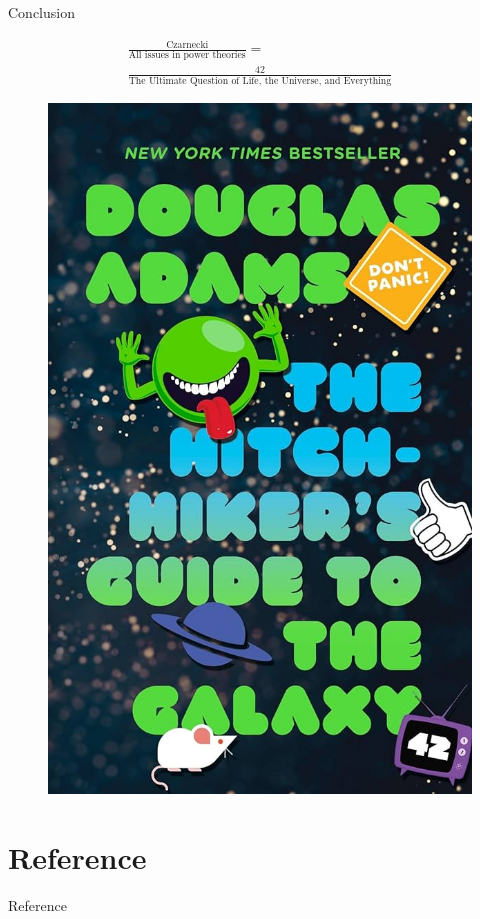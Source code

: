 \documentclass[aspectratio=169]{beamer}
\begin{document}
    \begin{frame}{Conclusion}
    
    {\large
        \begin{gather*}
            \frac{\text{Czarnecki}}{\text{All issues in power theories}} = \\  \frac{42}{\text{The Ultimate Question of Life, the Universe, and Everything}}
        \end{gather*}
    }
    \begin{figure}
          \centering
          \includegraphics[width=0.2\columnwidth]{guide.jpg}
      \end{figure}
    \end{frame}

    \section{Reference}
    \begin{frame}{Reference}
        \nocite{*}
        \printbibliography
    \end{frame}
    
    \maketitle
\end{document}
